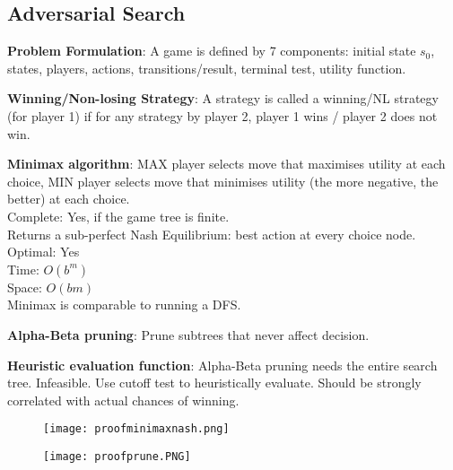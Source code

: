 \documentclass[a4paper,landscape]{article}
\newcommand{\rntopic}[1]{\vspace{-2.0em}\subsection*{#1}\vspace{-1.0em}}
\newcommand{\rnname}[1]{\textbf{#1}}
\begin{document}
\begin{multicols*}{4}
\begin{flatitemize}
\end{flatitemize}

\vspace{-0.3cm}
\begin{flatitemize}
\rntopic{Adversarial Search}
\item \rnname{Problem Formulation}: A game is defined by 7 components: initial state $s_0$, states, players, actions, transitions/result, terminal test, utility function.
\item \rnname{Winning/Non-losing Strategy}: A strategy is called a winning/NL strategy (for player 1) if for any strategy by player 2, player 1 wins / player 2 does not win.
\item \rnname{Minimax algorithm}: MAX player selects move that maximises utility at each choice, MIN player selects move that minimises utility (the more negative, the better) at each choice.\\
Complete: Yes, if the game tree is finite.\\
Returns a sub-perfect Nash Equilibrium: best action at every choice node.
Optimal: Yes\\
Time: $O(b^m)$\\
Space: $O(bm)$\\
Minimax is comparable to running a DFS.
\item \rnname{Alpha-Beta pruning}: Prune subtrees that never affect decision.

\item \rnname{Heuristic evaluation function}: Alpha-Beta pruning needs the entire search tree. Infeasible. Use cutoff test to heuristically evaluate. Should be strongly correlated with actual chances of winning. 

\vspace{-0.5cm}
    \begin{figure}[H]
      \texttt{[image: proofminimaxnash.png]}
    \end{figure}
\vspace{-0.4cm}

\vspace{-0.5cm}
    \begin{figure}[H]
      \texttt{[image: proofprune.PNG]}
    \end{figure}
\vspace{-0.4cm}

\end{flatitemize}


\end{multicols*}
\end{document}
